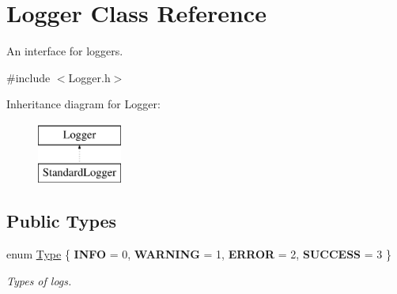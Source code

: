 \hypertarget{class_logger}{}\section{Logger Class Reference}
\label{class_logger}


An interface for loggers.  




{\ttfamily \#include $<$Logger.\+h$>$}

Inheritance diagram for Logger\+:\begin{figure}[H]
\begin{center}
\leavevmode
\includegraphics[height=2.000000cm]{class_logger}
\end{center}
\end{figure}
\subsection*{Public Types}
\begin{DoxyCompactItemize}
\item 
\mbox{\label{class_logger_acd39cb578d7a6750c959f2fad38d8db6}} 
enum \mbox{\hyperlink{class_logger_acd39cb578d7a6750c959f2fad38d8db6}{Type}} \{ {\bfseries I\+N\+FO} = 0, 
{\bfseries W\+A\+R\+N\+I\+NG} = 1, 
{\bfseries E\+R\+R\+OR} = 2, 
{\bfseries S\+U\+C\+C\+E\+SS} = 3
 \}
\begin{DoxyCompactList}\small\item\em Types of logs. \end{DoxyCompactList}\end{DoxyCompactItemize}
